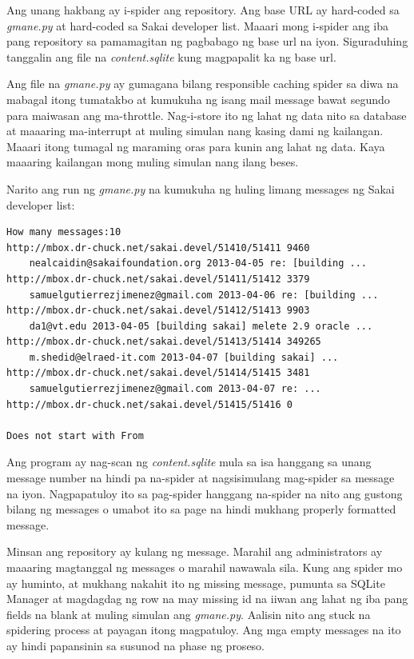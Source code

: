 \documentclass[10pt,]{book}
\begin{document}
Ang unang hakbang ay i-spider ang repository. Ang base URL ay hard-coded
sa \emph{gmane.py} at hard-coded sa Sakai developer list. Maaari mong
i-spider ang iba pang repository sa pamamagitan ng pagbabago ng base url
na iyon. Siguraduhing tanggalin ang file na \emph{content.sqlite} kung
magpapalit ka ng base url.

Ang file na \emph{gmane.py} ay gumagana bilang responsible caching
spider sa diwa na mabagal itong tumatakbo at kumukuha ng isang mail
message bawat segundo para maiwasan ang ma-throttle. Nag-i-store ito ng
lahat ng data nito sa database at maaaring ma-interrupt at muling
simulan nang kasing dami ng kailangan. Maaari itong tumagal ng maraming
oras para kunin ang lahat ng data. Kaya maaaring kailangan mong muling
simulan nang ilang beses.

Narito ang run ng \emph{gmane.py} na kumukuha ng huling limang messages
ng Sakai developer list:

{\small
\begin{verbatim}
How many messages:10
http://mbox.dr-chuck.net/sakai.devel/51410/51411 9460
    nealcaidin@sakaifoundation.org 2013-04-05 re: [building ...
http://mbox.dr-chuck.net/sakai.devel/51411/51412 3379
    samuelgutierrezjimenez@gmail.com 2013-04-06 re: [building ...
http://mbox.dr-chuck.net/sakai.devel/51412/51413 9903
    da1@vt.edu 2013-04-05 [building sakai] melete 2.9 oracle ...
http://mbox.dr-chuck.net/sakai.devel/51413/51414 349265
    m.shedid@elraed-it.com 2013-04-07 [building sakai] ...
http://mbox.dr-chuck.net/sakai.devel/51414/51415 3481
    samuelgutierrezjimenez@gmail.com 2013-04-07 re: ...
http://mbox.dr-chuck.net/sakai.devel/51415/51416 0

Does not start with From
\end{verbatim}
}

Ang program ay nag-scan ng \emph{content.sqlite} mula sa isa hanggang sa
unang message number na hindi pa na-spider at nagsisimulang mag-spider
sa message na iyon. Nagpapatuloy ito sa pag-spider hanggang na-spider na
nito ang gustong bilang ng messages o umabot ito sa page na hindi
mukhang properly formatted message.

Minsan ang repository ay kulang ng message. Marahil ang administrators
ay maaaring magtanggal ng messages o marahil nawawala sila. Kung ang
spider mo ay huminto, at mukhang nakahit ito ng missing message, pumunta
sa SQLite Manager at magdagdag ng row na may missing id na iiwan ang
lahat ng iba pang fields na blank at muling simulan ang \emph{gmane.py}.
Aalisin nito ang stuck na spidering process at payagan itong magpatuloy.
Ang mga empty messages na ito ay hindi papansinin sa susunod na phase ng
proseso.
\end{document}
